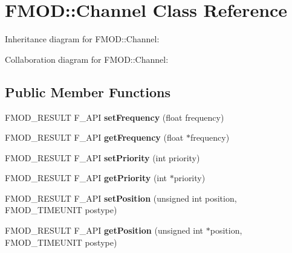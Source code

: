 \hypertarget{class_f_m_o_d_1_1_channel}{\section{F\+M\+O\+D\+:\+:Channel Class Reference}
\label{class_f_m_o_d_1_1_channel}
}


Inheritance diagram for F\+M\+O\+D\+:\+:Channel\+:


Collaboration diagram for F\+M\+O\+D\+:\+:Channel\+:
\subsection*{Public Member Functions}
\begin{DoxyCompactItemize}
\item 
\hypertarget{class_f_m_o_d_1_1_channel_a355cd052a405c0ecdbaac7c65d24148b}{F\+M\+O\+D\+\_\+\+R\+E\+S\+U\+L\+T F\+\_\+\+A\+P\+I {\bfseries set\+Frequency} (float frequency)}\label{class_f_m_o_d_1_1_channel_a355cd052a405c0ecdbaac7c65d24148b}

\item 
\hypertarget{class_f_m_o_d_1_1_channel_a99f1dcf4b2a67f509d08f138e9e3cbca}{F\+M\+O\+D\+\_\+\+R\+E\+S\+U\+L\+T F\+\_\+\+A\+P\+I {\bfseries get\+Frequency} (float $\ast$frequency)}\label{class_f_m_o_d_1_1_channel_a99f1dcf4b2a67f509d08f138e9e3cbca}

\item 
\hypertarget{class_f_m_o_d_1_1_channel_a83a9a2f49e4bdde446f0d574847f5329}{F\+M\+O\+D\+\_\+\+R\+E\+S\+U\+L\+T F\+\_\+\+A\+P\+I {\bfseries set\+Priority} (int priority)}\label{class_f_m_o_d_1_1_channel_a83a9a2f49e4bdde446f0d574847f5329}

\item 
\hypertarget{class_f_m_o_d_1_1_channel_ae2a16710e706c0223937bc99fb3cad3d}{F\+M\+O\+D\+\_\+\+R\+E\+S\+U\+L\+T F\+\_\+\+A\+P\+I {\bfseries get\+Priority} (int $\ast$priority)}\label{class_f_m_o_d_1_1_channel_ae2a16710e706c0223937bc99fb3cad3d}

\item 
\hypertarget{class_f_m_o_d_1_1_channel_a46f8f6738b500bbb995bd4a4ecce826f}{F\+M\+O\+D\+\_\+\+R\+E\+S\+U\+L\+T F\+\_\+\+A\+P\+I {\bfseries set\+Position} (unsigned int position, F\+M\+O\+D\+\_\+\+T\+I\+M\+E\+U\+N\+I\+T postype)}\label{class_f_m_o_d_1_1_channel_a46f8f6738b500bbb995bd4a4ecce826f}

\item 
\hypertarget{class_f_m_o_d_1_1_channel_a580cb740f80cf139faaf21181490d98f}{F\+M\+O\+D\+\_\+\+R\+E\+S\+U\+L\+T F\+\_\+\+A\+P\+I {\bfseries get\+Position} (unsigned int $\ast$position, F\+M\+O\+D\+\_\+\+T\+I\+M\+E\+U\+N\+I\+T postype)}\label{class_f_m_o_d_1_1_channel_a580cb740f80cf139faaf21181490d98f}


\end{DoxyCompactItemize}
